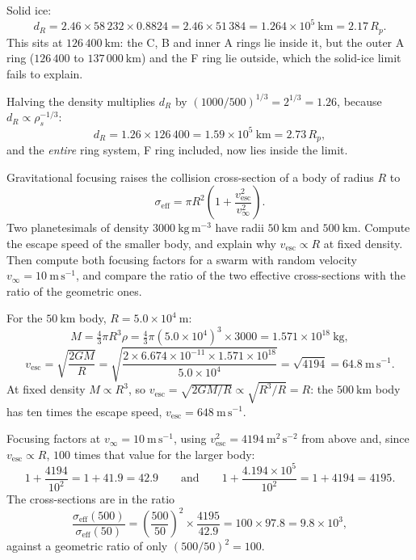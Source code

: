 \begin{solution}
Solid ice:
\[
  d_R = 2.46 \times 58\,232 \times 0.8824 = 2.46 \times 51\,384
      = 1.264 \times 10^{5}\ \mathrm{km} = 2.17\,R_p.
\]
This sits at $126\,400\ \mathrm{km}$: the C, B and inner A rings lie inside it, but the outer A
ring ($126\,400$ to $137\,000\ \mathrm{km}$) and the F ring lie outside, which the solid-ice
limit fails to explain.

Halving the density multiplies $d_R$ by $(1000/500)^{1/3} = 2^{1/3} = 1.26$, because
$d_R \propto \rho_s^{-1/3}$:
\[
  d_R = 1.26 \times 126\,400 = 1.59 \times 10^{5}\ \mathrm{km} = 2.73\,R_p,
\]
and the \emph{entire} ring system, F ring included, now lies inside the limit.
\end{solution}


\parti Gravitational focusing raises the collision cross-section of a body of radius $R$ to
\[
  \sigma_{\mathrm{eff}} = \pi R^2 \left(1 + \frac{v_{\mathrm{esc}}^2}{v_\infty^2}\right).
\]
Two planetesimals of density $3000\ \mathrm{kg\,m^{-3}}$ have radii $50\ \mathrm{km}$ and
$500\ \mathrm{km}$. Compute the escape speed of the smaller body,
and explain why $v_{\mathrm{esc}} \propto R$ at fixed density. Then compute both focusing factors
for a swarm with random velocity $v_\infty = 10\ \mathrm{m\,s^{-1}}$, and compare the ratio of the
two effective cross-sections with the ratio of the geometric ones.

\begin{solution}
For the $50\ \mathrm{km}$ body, $R = 5.0 \times 10^{4}\ \mathrm{m}$:
\[
  M = \tfrac{4}{3}\pi R^3 \rho
    = \tfrac{4}{3}\pi (5.0 \times 10^{4})^3 \times 3000
    = 1.571 \times 10^{18}\ \mathrm{kg},
\]
\[
  v_{\mathrm{esc}} = \sqrt{\frac{2 G M}{R}}
    = \sqrt{\frac{2 \times 6.674 \times 10^{-11} \times 1.571 \times 10^{18}}{5.0 \times 10^{4}}}
    = \sqrt{4194}
    = 64.8\ \mathrm{m\,s^{-1}}.
\]
At fixed density $M \propto R^3$, so
$v_{\mathrm{esc}} = \sqrt{2GM/R} \propto \sqrt{R^3/R} = R$: the $500\ \mathrm{km}$ body has ten
times the escape speed, $v_{\mathrm{esc}} = 648\ \mathrm{m\,s^{-1}}$.

Focusing factors at $v_\infty = 10\ \mathrm{m\,s^{-1}}$, using
$v_{\mathrm{esc}}^2 = 4194\ \mathrm{m^2\,s^{-2}}$ from above and, since
$v_{\mathrm{esc}} \propto R$, $100$ times that value for the larger body:
\[
  1 + \frac{4194}{10^2} = 1 + 41.9 = 42.9
  \qquad\text{and}\qquad
  1 + \frac{4.194 \times 10^{5}}{10^2} = 1 + 4194 = 4195.
\]
The cross-sections are in the ratio
\[
  \frac{\sigma_{\mathrm{eff}}(500)}{\sigma_{\mathrm{eff}}(50)}
    = \left(\frac{500}{50}\right)^2 \times \frac{4195}{42.9}
    = 100 \times 97.8
    = 9.8 \times 10^{3},
\]
against a geometric ratio of only $(500/50)^2 = 100$.
\end{solution}

